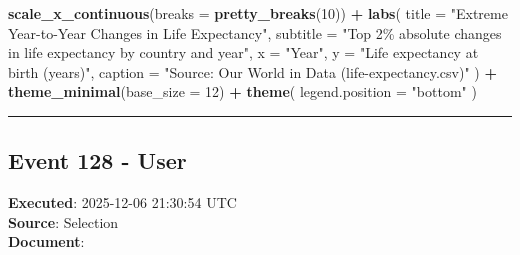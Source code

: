 \documentclass[
  11pt,
]{article}
\newenvironment{Shaded}{\begin{snugshade}}{\end{snugshade}}
\newcommand{\AttributeTok}[1]{\textcolor[rgb]{0.13,0.29,0.53}{#1}}
\newcommand{\DecValTok}[1]{\textcolor[rgb]{0.00,0.00,0.81}{#1}}
\newcommand{\FunctionTok}[1]{\textcolor[rgb]{0.13,0.29,0.53}{\textbf{#1}}}
\newcommand{\NormalTok}[1]{#1}
\newcommand{\SpecialCharTok}[1]{\textcolor[rgb]{0.81,0.36,0.00}{\textbf{#1}}}
\newcommand{\StringTok}[1]{\textcolor[rgb]{0.31,0.60,0.02}{#1}}
\begin{document}
\begin{Shaded}
\begin{Highlighting}[]
  \FunctionTok{scale\_x\_continuous}\NormalTok{(}\AttributeTok{breaks =} \FunctionTok{pretty\_breaks}\NormalTok{(}\DecValTok{10}\NormalTok{)) }\SpecialCharTok{+}
  \FunctionTok{labs}\NormalTok{(}
    \AttributeTok{title =} \StringTok{"Extreme Year{-}to{-}Year Changes in Life Expectancy"}\NormalTok{,}
    \AttributeTok{subtitle =} \StringTok{"Top 2\% absolute changes in life expectancy by country and year"}\NormalTok{,}
    \AttributeTok{x =} \StringTok{"Year"}\NormalTok{,}
    \AttributeTok{y =} \StringTok{"Life expectancy at birth (years)"}\NormalTok{,}
    \AttributeTok{caption =} \StringTok{"Source: Our World in Data (life{-}expectancy.csv)"}
\NormalTok{  ) }\SpecialCharTok{+}
  \FunctionTok{theme\_minimal}\NormalTok{(}\AttributeTok{base\_size =} \DecValTok{12}\NormalTok{) }\SpecialCharTok{+}
  \FunctionTok{theme}\NormalTok{(}
    \AttributeTok{legend.position =} \StringTok{"bottom"}
\NormalTok{  )}
\end{Highlighting}
\end{Shaded}

\begin{center}\rule{0.5\linewidth}{0.5pt}\end{center}

\subsection{Event 128 - User}\label{event-128---user}

\textbf{Executed}: 2025-12-06 21:30:54 UTC\\
\textbf{Source}: Selection\\
\textbf{Document}:
\end{document}
